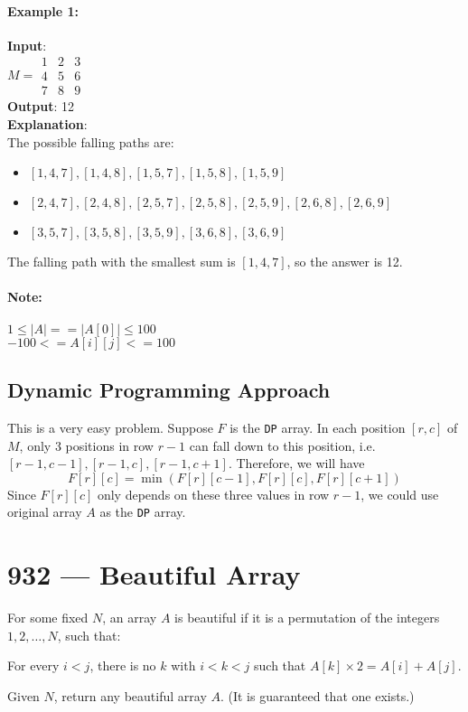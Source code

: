 \documentclass[a4paper,12pt]{article}
\begin{document}
\paragraph{Example 1:}
\begin{flushleft}
\textbf{Input}:
\\
$M = \begin{array}{ccc}
1 & 2 & 3 \\
4 & 5 & 6 \\
7 & 8 & 9 
\end{array}$
\\
\textbf{Output}: 12
\\
\textbf{Explanation}:
\\
The possible falling paths are:
\begin{itemize}
\item $[1,4,7], [1,4,8], [1,5,7], [1,5,8], [1,5,9]$
\item $[2,4,7], [2,4,8], [2,5,7], [2,5,8], [2,5,9], [2,6,8], [2,6,9]$
\item $[3,5,7], [3,5,8], [3,5,9], [3,6,8], [3,6,9]$
\end{itemize}
The falling path with the smallest sum is $[1,4,7]$, so the answer is 12.
\end{flushleft}
\paragraph{Note:}
\begin{flushleft}
$1 \leq |A| == |A[0]| \leq 100$
\\
$-100 <= A[i][j] <= 100$
\end{flushleft}
\subsection{Dynamic Programming Approach}
This is a very easy problem. Suppose $F$ is the \texttt{DP} array. In each position $[r,c]$ of $M$, only 3 positions in row $r-1$ can fall down to this position, i.e. $[r-1, c-1], [r-1,c], [r-1,c+1]$. Therefore, we will have
\[
F[r][c] = \min(F[r][c-1], F[r][c], F[r][c+1])
\]
Since $F[r][c]$ only depends on these three values in row $r-1$, we could use original array $A$ as the \texttt{DP} array.

\section{932 --- Beautiful Array}
For some fixed $N$, an array $A$ is beautiful if it is a permutation of the integers $1, 2, \ldots, N$, such that:
\par
For every $i < j$, there is no $k$ with $i < k < j$ such that $A[k] \times 2 = A[i] + A[j]$.
\par
Given $N$, return any beautiful array $A$.  (It is guaranteed that one exists.)
\end{document}
